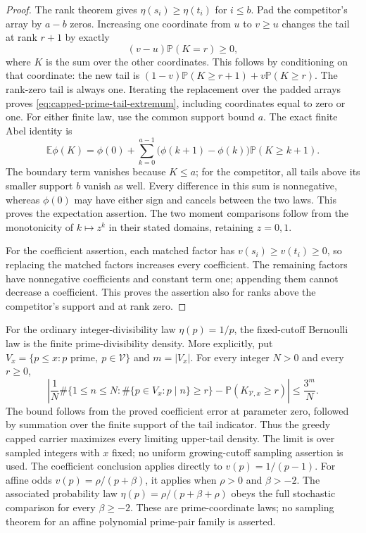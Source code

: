 \documentclass[11pt]{article}
\theoremstyle{definition}
\begin{document}
\begin{proof}
The rank theorem gives $\eta(s_i)\ge\eta(t_i)$ for $i\le b$.
Pad the competitor's array by $a-b$ zeros.
Increasing one coordinate from $u$ to $v\ge u$ changes
the tail at rank $r+1$ by exactly
\[
 (v-u)\mathbb P(K=r)\ge0,
\]
where $K$ is the sum over the other coordinates.
This follows by conditioning on that coordinate:
the new tail is $(1-v)\mathbb P(K\ge r+1)+v\mathbb P(K\ge r)$.
The rank-zero tail is always one.
Iterating the replacement over the padded arrays proves
\eqref{eq:capped-prime-tail-extremum}, including coordinates
equal to zero or one.
For either finite law, use the common support bound $a$.
The exact finite Abel identity is
\[
 \mathbb E\phi(K)=\phi(0)+
   \sum_{k=0}^{a-1}\bigl(\phi(k+1)-\phi(k)\bigr)
                                      \mathbb P(K\ge k+1).
\]
The boundary term vanishes because $K\le a$; for the competitor,
all tails above its smaller support $b$ vanish as well.
Every difference in this sum is nonnegative, whereas $\phi(0)$
may have either sign and cancels between the two laws.
This proves the expectation assertion.
The two moment comparisons follow from the monotonicity of
$k\mapsto z^k$ in their stated domains, retaining $z=0,1$.

For the coefficient assertion, each matched factor has
$v(s_i)\ge v(t_i)\ge0$, so replacing the matched factors
increases every coefficient.
The remaining factors have nonnegative coefficients and
constant term one; appending them cannot decrease a coefficient.
This proves the assertion also for ranks above the competitor's
support and at rank zero.
\end{proof}

For the ordinary integer-divisibility law $\eta(p)=1/p$,
the fixed-cutoff Bernoulli law is the finite prime-divisibility density.
More explicitly, put \(V_x=\{p\le x:p\text{ prime},\ p\in\mathcal V\}\)
and \(m=|V_x|\). For every integer \(N>0\) and every \(r\ge0\),
\[
 \left|\frac1N\#\{1\le n\le N:
             \#\{p\in V_x:p\mid n\}\ge r\}
       -\mathbb P(K_{\mathcal V,x}\ge r)\right|
 \le \frac{3^m}{N}.
\]
The bound follows from the proved coefficient error at parameter zero,
followed by summation over the finite support of the tail indicator.
Thus the greedy capped carrier maximizes every limiting upper-tail
density. The limit is over sampled integers with \(x\) fixed;
no uniform growing-cutoff sampling assertion is used.
The coefficient conclusion applies directly to \(v(p)=1/(p-1)\).
For affine odds \(v(p)=\rho/(p+\beta)\), it applies when
\(\rho>0\) and \(\beta>-2\).
The associated probability law
\(\eta(p)=\rho/(p+\beta+\rho)\) obeys the full stochastic comparison
for every \(\beta\ge-2\).
These are prime-coordinate laws; no sampling theorem for an affine
polynomial prime-pair family is asserted.
\end{document}
